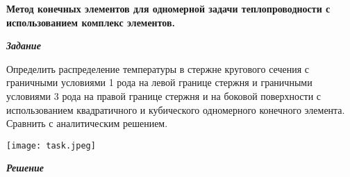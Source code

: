 \documentclass[a4paper, 12pt]{article}
\begin{document}
\begin{center}
\textbf{Метод конечных элементов для одномерной задачи теплопроводности с использованием комплекс элементов.}
\end{center}
\begin{center}
\textbf{\textit{Задание}}
\end{center}

Определить распределение температуры в стержне кругового сечения с граничными условиями 1 рода на левой границе стержня и граничными условиями 3 рода на правой границе стержня и на боковой поверхности с использованием квадратичного и кубического одномерного конечного элемента. Сравнить с аналитическим решением.

\begin{center}
    \texttt{[image: task.jpeg]}
\end{center}

\begin{center}
    \textbf{\textit{Решение}}
\end{center}
\end{document}
